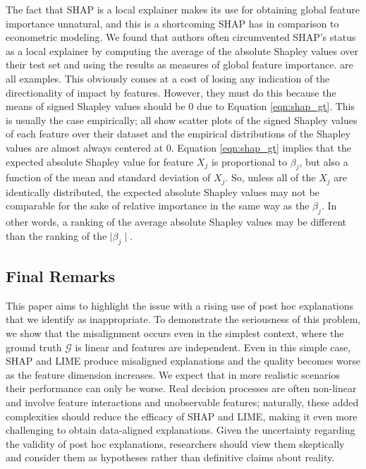 \documentclass[12pt]{article}  %
\begin{document}
     The fact that SHAP is a local explainer makes its use for obtaining global feature importance unnatural, and this is a shortcoming SHAP has in comparison to econometric modeling. We found that authors often circumvented SHAP's status as a local explainer by computing the average of the absolute Shapley values over their test set and using the results as measures of global feature importance. \cite{lenaers23rent,maeng23vr,guenther2023useful} are all examples. This obviously comes at a cost of losing any indication of the directionality of impact by features. However, they must do this because the means of signed Shapley values should be 0 due to Equation \ref{eqn:shap_gt}. This is usually the case empirically; \cite{lenaers23rent,maeng23vr,jiang24churn} all show scatter plots of the signed Shapley values of each feature over their dataset and the empirical distributions of the Shapley values are almost always centered at 0. Equation \ref{eqn:shap_gt} implies that the expected absolute Shapley value for feature $X_j$ is proportional to $\beta_j$, but also a function of the mean and standard deviation of $X_j$. So, unless all of the $X_j$ are identically distributed, the expected absolute Shapley values may not be comparable for the sake of relative importance in the same way as the $\beta_j$. In other words, a ranking of the average absolute Shapley values may be different than the ranking of the $\mid \beta_j\mid$.  %

\subsection{Final Remarks}%
This paper aims to highlight the issue with a rising use of post hoc explanations that we identify as inappropriate. To demonstrate the seriousness of this problem, we show that the misalignment occurs even in the simplest context, where the ground truth $\mathcal{G}$ is linear and features are  independent. Even in this simple case, SHAP and LIME produce misaligned explanations and the quality becomes worse as the feature dimension increases. We expect that in more realistic scenarios their performance can only be worse. Real decision processes are often non-linear and involve feature interactions and unobservable features; naturally, these added complexities should reduce the efficacy of SHAP and LIME, making it even more challenging to obtain data-aligned explanations. Given the uncertainty regarding the validity of post hoc explanations, researchers should view them skeptically and consider them as hypotheses rather than definitive claims about reality. 
\end{document}
